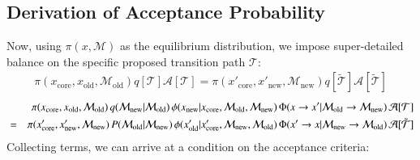 \subsection{Derivation of Acceptance Probability}
%
Now, using $\pi (x, \mathcal{M})$ as the equilibrium distribution, we impose super-detailed balance on the specific proposed transition path $\mathcal{T}$:
\begin{eqnarray}
%
\pi(x_\mathrm{core}, x_\mathrm{old}, \mathcal{M}_\mathrm{old}) q[\mathcal{T}] \mathcal{A}[\mathcal{T}] = \pi(x'_\mathrm{core}, x'_\mathrm{new}, \mathcal{M}_\mathrm{new}) q[\tilde{\mathcal{T}}] \mathcal{A}[\tilde{\mathcal{T}}]
%
\end{eqnarray}
%
\begin{eqnarray}
&& \pi(x_\mathrm{core}, x_\mathrm{old}, \mathcal{M}_\mathrm{old}) \, q(\mathcal{M}_\mathrm{new} | \mathcal{M}_\mathrm{old}) \, \phi(x_\mathrm{new} | x_\mathrm{core}, \mathcal{M}_\mathrm{old}, \mathcal{M}_\mathrm{new}) \, \Phi(x \rightarrow x' | \mathcal{M}_\mathrm{old} \rightarrow \mathcal{M}_\mathrm{new}) \, \mathcal{A}[\mathcal{T}] \nonumber \notag \\
%
&=& \pi(x'_\mathrm{core}, x'_\mathrm{new}, \mathcal{M}_\mathrm{new}) \, P(\mathcal{M}_\mathrm{old} | \mathcal{M}_\mathrm{new}) \, \phi(x'_\mathrm{old} | x'_\mathrm{core}, \mathcal{M}_\mathrm{new}, \mathcal{M}_\mathrm{old}) \, \Phi(x' \rightarrow x | \mathcal{M}_\mathrm{new} \rightarrow \mathcal{M}_\mathrm{old}) \, \mathcal{A}[\tilde{\mathcal{T}}] \nonumber \\
%
%
\end{eqnarray}
Collecting terms, we can arrive at a condition on the acceptance criteria:

